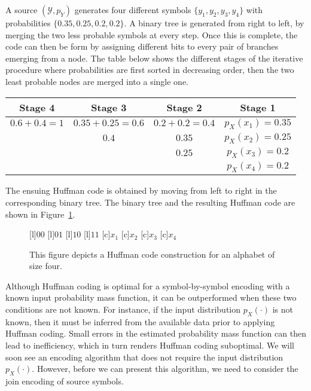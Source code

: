 \begin{example}
A source $(\mathcal{Y}, p_Y)$ generates four different symbols $\{ y_1, y_2, y_3, y_4 \}$ with probabilities $\{ 0.35, 0.25, 0.2, 0.2 \}$.
A binary tree is generated from right to left, by merging the two less probable symbols at every step.
Once this is complete, the code can then be form by assigning different bits to every pair of branches emerging from a node.
The table below shows the different stages of the iterative procedure where probabilities are first sorted in decreasing order, then the two least probable nodes are merged into a single one.

\begin{center}
\begin{tabular}{|c|c|c|c|}
\hline
Stage 4 & Stage 3 & Stage 2 & Stage 1 \\
\hline
$0.6 + 0.4 = 1$ & $0.35 + 0.25 = 0.6$ & $0.2 + 0.2 = 0.4$ & $p_X (x_1) = 0.35$ \\
& $0.4$ & $0.35$ & $p_X (x_2) = 0.25$ \\
& & $0.25$ & $p_X (x_3) = 0.2$ \\
& & & $p_X (x_4) = 0.2$ \\
\hline
\end{tabular}
\end{center}

The ensuing Huffman code is obtained by moving from left to right in the corresponding binary tree.
The binary tree and the resulting Huffman code are shown in Figure~\ref{figure:Huffman2}.

\begin{figure}[htbp]
\begin{center}
\begin{psfrags}
[l]{$00$}
[l]{$01$}
[l]{$10$}
[l]{$11$}
[c]{$x_1$}
[c]{$x_2$}
[c]{$x_3$}
[c]{$x_4$}
\end{psfrags}
\caption{This figure depicts a Huffman code construction for an alphabet of size four.}
\label{figure:Huffman2}
\end{center}
\end{figure}

\end{example}

Although Huffman coding is optimal for a symbol-by-symbol encoding with a known input probability mass function, it can be outperformed when these two conditions are not known.
For instance, if the input distribution $p_X(\cdot)$ is not known, then it must be inferred from the available data prior to applying Huffman coding.
Small errors in the estimated probability mass function can then lead to inefficiency, which in turn renders Huffman coding suboptimal.
We will soon see an encoding algorithm that does not require the input distribution $p_X(\cdot)$.
However, before we can present this algorithm, we need to consider the join encoding of source symbols.


